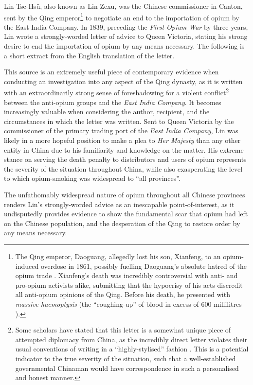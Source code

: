 \documentclass{article}
\begin{document}
        Lin Tse-Hs\"u, also known as Lin Zexu, was the Chinese commissioner in Canton, sent by the Qing emperor\footnote{The Qing emperor, Daoguang, allegedly lost his son, Xianfeng, to an opium-induced overdose in 1861, possibly fuelling Daoguang's absolute hatred of the opium trade \autocite{Ringmar:2013}. Xianfeng's death was incredibly controversial with anti- and pro-opium activists alike, submitting that the hypocrisy of his acts discredit all anti-opium opinions of the Qing. Before his death, he presented with \textit{massive haemoptysis} (the ``coughing-up'' of blood in excess of 600 millilitres \autocite{Sabatine:2013}).} to negotiate an end to the importation of opium by the East India Company. In 1839, preceding the \textit{First Opium War} by three years, Lin wrote a strongly-worded letter of advice to Queen Victoria, stating his strong desire to end the importation of opium by any means necessary. The following is a short extract from the English translation of the letter.


        This source is an extremely useful piece of contemporary evidence when conducting an investigation into any aspect of the Qing dynasty, as it is written with an extraordinarily strong sense of foreshadowing for a violent conflict\footnote{Some scholars have stated that this letter is a somewhat unique piece of attempted diplomacy from China, as the incredibly direct letter violates their usual conventions of writing in a ``highly-stylised'' fashion \autocite{Kishlansky:1995}. This is a potential indicator to the true severity of the situation, such that a well-established governmental Chinaman would have correspondence in such a personalised and honest manner.} between the anti-opium groups and the \textit{East India Company}. It becomes increasingly valuable when considering the author, recipient, and the circumstances in which the letter was written. Sent to Queen Victoria by the commissioner of the primary trading port of the \textit{East India Company}, Lin was likely in a more hopeful position to make a plea to \textit{Her Majesty} than any other entity in China due to his familiarity and knowledge on the matter. His extreme stance on serving the death penalty to distributors and users of opium represents the severity of the situation throughout China, while also exasperating the level to which opium-smoking was widespread to ``all provinces''.

        The unfathomably widespread nature of opium throughout all Chinese provinces renders Lin's strongly-worded advice as an inescapable point-of-interest, as it undisputedly provides evidence to show the fundamental scar that opium had left on the Chinese population, and the desperation of the Qing to restore order by any means necessary.
\end{document}
